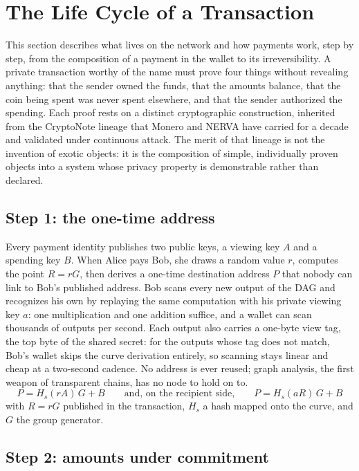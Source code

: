 
\section{The Life Cycle of a Transaction}\label{sec:tx}

This section describes what lives on the network and how payments work,
step by step, from the composition of a payment in the wallet to its
irreversibility. A private transaction worthy of the name must prove four
things without revealing anything: that the sender owned the funds, that
the amounts balance, that the coin being spent was never spent elsewhere,
and that the sender authorized the spending. Each proof rests on a
distinct cryptographic construction, inherited from the CryptoNote lineage
that Monero and NERVA have carried for a decade and validated under
continuous attack. The merit of that lineage is not the invention of
exotic objects: it is the composition of simple, individually proven
objects into a system whose privacy property is demonstrable rather than
declared.

\subsection{Step 1: the one-time address}

Every payment identity publishes two public keys, a viewing key $A$ and a
spending key $B$. When Alice pays Bob, she draws a random value $r$,
computes the point $R = rG$, then derives a one-time destination address
$P$ that nobody can link to Bob's published address. Bob scans every new
output of the DAG and recognizes his own by replaying the same computation
with his private viewing key $a$: one multiplication and one addition
suffice, and a wallet can scan thousands of outputs per second. Each
output also carries a one-byte view tag, the top byte of the shared
secret: for the outputs whose tag does not match, Bob's wallet skips the
curve derivation entirely, so scanning stays linear and cheap at a
two-second cadence. No address
is ever reused; graph analysis, the first weapon of transparent chains,
has no node to hold on to.
\begin{equation}\label{eq:onetim}
P = H_s(rA)\,G + B
\qquad\text{and, on the recipient side,}\qquad
P = H_s(aR)\,G + B
\end{equation}
with $R = rG$ published in the transaction, $H_s$ a hash mapped onto the
curve, and $G$ the group generator.

\subsection{Step 2: amounts under commitment}

